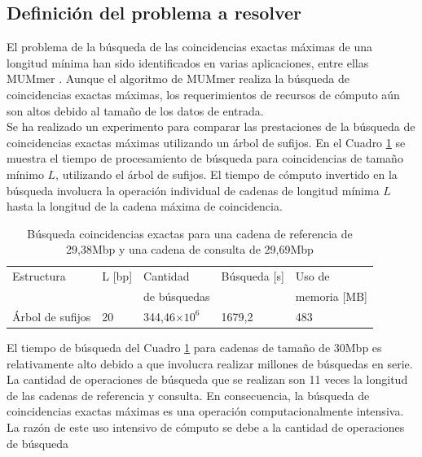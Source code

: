 \documentclass[12pt,a4paper]{article}
\providecommand{\e}[1]{\ensuremath{\times 10^{#1}}}
\begin{document}
\subsection{Definición del problema a resolver}
\indent
El problema de la búsqueda de las coincidencias exactas máximas de una longitud mínima han sido identificados en varias aplicaciones, entre ellas MUMmer \cite{Mummer3}. Aunque el algoritmo de MUMmer realiza la búsqueda de coincidencias exactas máximas, los requerimientos de recursos de cómputo aún son altos debido al tamaño de los datos de entrada.\\
\indent
Se ha realizado un experimento para comparar las prestaciones de la búsqueda de
coincidencias exactas máximas utilizando un árbol de sufijos. En el Cuadro 
\ref{tab:buscar} se muestra el tiempo de procesamiento de búsqueda 
para coincidencias de tamaño mínimo $L$, utilizando el árbol de sufijos. El tiempo 
de cómputo invertido en la búsqueda involucra la operación individual de cadenas de longitud mínima $L$ hasta la longitud de la cadena máxima de coincidencia. \\
\begin{table}[ h!] 
  \begin{small}
    \begin{center}
      \begin{tabular}{lllll}
        Estructura & L [bp] & Cantidad  & Búsqueda [s] & Uso de\\
        & & de búsquedas & & memoria [MB] \\
        \hline
        Árbol de sufijos & 20 & 344,46\e{6}  & 1679,2 & 483 \\
        \hline
      \end{tabular}
    \end{center}
  \end{small}
  \caption{Búsqueda coincidencias exactas para una cadena de referencia de 
  29,38Mbp y una cadena de consulta de 29,69Mbp}
  \label{tab:buscar}
\end{table}
\indent
El tiempo de búsqueda del Cuadro \ref{tab:buscar} para cadenas de tamaño de 30Mbp
es relativamente alto debido a que involucra realizar millones de búsquedas en
serie. La cantidad de operaciones de búsqueda que se realizan son 11 veces la 
longitud de las cadenas de referencia y consulta. En consecuencia, la búsqueda 
de coincidencias exactas máximas es una operación computacionalmente intensiva. 
La razón de este uso intensivo de cómputo se debe a la cantidad de operaciones de búsqueda
\end{document}

